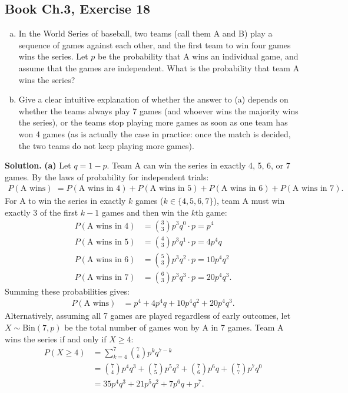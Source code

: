 \documentclass[11pt,a4paper]{article}
\begin{document}
\vspace{10pt}
\subsection{Book Ch.3, Exercise 18}
\begin{tcolorbox}[title={Book Ch.3, Exercise 18}]
\begin{enumerate}[(a)]
\item In the World Series of baseball, two teams (call them A and B) play a sequence of games against each other, and the first team to win four games wins the series. Let $p$ be the probability that A wins an individual game, and assume that the games are independent. What is the probability that team A wins the series?
\item Give a clear intuitive explanation of whether the answer to (a) depends on whether the teams always play 7 games (and whoever wins the majority wins the series), or the teams stop playing more games as soon as one team has won 4 games (as is actually the case in practice: once the match is decided, the two teams do not keep playing more games).
\end{enumerate}
\end{tcolorbox}

\noindent \textbf{Solution.} \textbf{(a)} Let $q = 1 - p$. Team A can win the series in exactly 4, 5, 6, or 7 games. By the laws of probability for independent trials:
\begin{align*}
P(\text{A wins}) &= P(\text{A wins in 4}) + P(\text{A wins in 5}) + P(\text{A wins in 6}) + P(\text{A wins in 7}).
\end{align*}
For A to win the series in exactly $k$ games ($k \in \{4, 5, 6, 7\}$), team A must win exactly 3 of the first $k-1$ games and then win the $k$th game:
\begin{align*}
P(\text{A wins in 4}) &= \binom{3}{3} p^3 q^0 \cdot p = p^4 \\
P(\text{A wins in 5}) &= \binom{4}{3} p^3 q^1 \cdot p = 4 p^4 q \\
P(\text{A wins in 6}) &= \binom{5}{3} p^3 q^2 \cdot p = 10 p^4 q^2 \\
P(\text{A wins in 7}) &= \binom{6}{3} p^3 q^3 \cdot p = 20 p^4 q^3.
\end{align*}
Summing these probabilities gives:
\begin{align*}
P(\text{A wins}) &= p^4 + 4 p^4 q + 10 p^4 q^2 + 20 p^4 q^3.
\end{align*}
Alternatively, assuming all 7 games are played regardless of early outcomes, let $X \sim \text{Bin}(7, p)$ be the total number of games won by A in 7 games. Team A wins the series if and only if $X \ge 4$:
\begin{align*}
P(X \ge 4) &= \sum_{k=4}^{7} \binom{7}{k} p^k q^{7-k} \\
&= \binom{7}{4} p^4 q^3 + \binom{7}{5} p^5 q^2 + \binom{7}{6} p^6 q + \binom{7}{7} p^7 q^0 \\
&= 35 p^4 q^3 + 21 p^5 q^2 + 7 p^6 q + p^7.
\end{align*}
\end{document}
